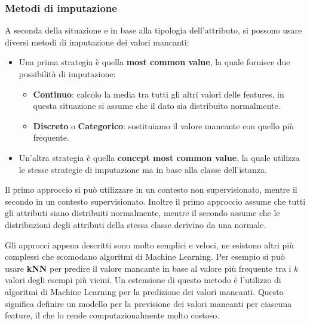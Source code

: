 \subsubsection{Metodi di imputazione}
A seconda della situazione e in base alla tipologia dell'attributo, si possono
usare diversi metodi di imputazione dei valori mancanti:
\begin{itemize}
      \item Una prima strategia è quella \textbf{most common value}, la quale
            fornisce due possibilità di imputazione:
            \begin{itemize}
                  \item \textbf{Continuo}: calcolo la media tra tutti gli altri
                        valori delle features, in questa situazione si assume che il
                        dato sia distribuito normalmente.
                  \item \textbf{Discreto} o \textbf{Categorico}: sostituiamo il valore
                        mancante con quello più frequente.
            \end{itemize}
      \item Un'altra strategia è quella \textbf{concept most common value}, la quale utilizza le stesse
            strategie di imputazione ma in base alla classe dell'istanza.
\end{itemize}
Il primo approccio si può utilizzare in un contesto non supervisionato, mentre il
secondo in un contesto supervisionato. Inoltre il primo approccio assume che tutti
gli attributi siano distribuiti normalmente, mentre il secondo assume che le
distribuzioni degli attributi della stessa classe derivino da una normale.

Gli approcci appena descritti sono molto semplici e veloci, ne esistono altri più
complessi che scomodano algoritmi di Machine Learning. Per esempio si può usare
\textbf{kNN} per predire il valore mancante in base al valore più frequente tra
i $k$ valori degli esempi più vicini. Un estensione di questo metodo è l'utilizzo
di algoritmi di Machine Learning per la predizione dei valori mancanti. Questo
significa definire un modello per la previsione dei valori mancanti per ciascuna
feature, il che lo rende computazionalmente molto costoso.

